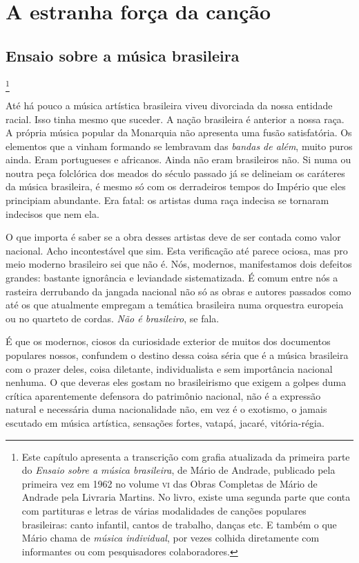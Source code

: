 \part{A estranha força da canção}

\chapter{Ensaio sobre a música brasileira}\footnote{Este capítulo apresenta a transcrição com grafia atualizada da primeira parte do \textit{Ensaio sobre a música brasileira}, de Mário de Andrade, publicado pela primeira vez em 1962 no volume \textsc{vi} das Obras Completas de Mário de Andrade pela Livraria Martins. No livro, existe uma segunda parte que conta com partituras e letras de várias modalidades de canções populares brasileiras: canto infantil, cantos de trabalho, danças etc. E também o que Mário chama de \textit{música individual}, por vezes colhida diretamente com informantes ou com pesquisadores colaboradores.}

Até há pouco a música artística brasileira viveu divorciada da nossa
entidade racial. Isso tinha mesmo que suceder. A nação brasileira é
anterior a nossa raça. A própria música popular da Monarquia não
apresenta uma fusão satisfatória. Os elementos que a vinham formando se
lembravam das \textit{bandas de além}, muito puros ainda. Eram portugueses
e africanos. Ainda não eram brasileiros não. Si numa ou noutra peça
folclórica dos meados do século passado já se delineiam os caráteres da
música brasileira, é mesmo só com os derradeiros tempos do Império que
eles principiam abundante. Era fatal: os artistas duma raça indecisa se
tornaram indecisos que nem ela.

O que importa é saber se a obra desses artistas deve de ser contada como
valor nacional. Acho incontestável que sim. Esta verificação até parece
ociosa, mas pro meio moderno brasileiro sei que não
é. Nós, modernos, manifestamos dois defeitos grandes:
bastante ignorância e leviandade sistematizada. É comum entre nós a
rasteira derrubando da jangada nacional não só as obras e autores
passados como até os que atualmente empregam a temática brasileira numa
orquestra europeia ou no quarteto de cordas. \textit{Não é brasileiro}, se fala.

É que os modernos, ciosos da curiosidade exterior de muitos dos
documentos populares nossos, confundem o destino dessa coisa séria que é
a música brasileira com o prazer deles, coisa diletante, individualista
e sem importância nacional nenhuma. O que deveras eles gostam no
brasileirismo que exigem a golpes duma crítica aparentemente defensora
do patrimônio nacional, não é a expressão natural e necessária duma
nacionalidade não, em vez é o exotismo, o jamais escutado em música
artística, sensações fortes, vatapá, jacaré, vitória-régia.

